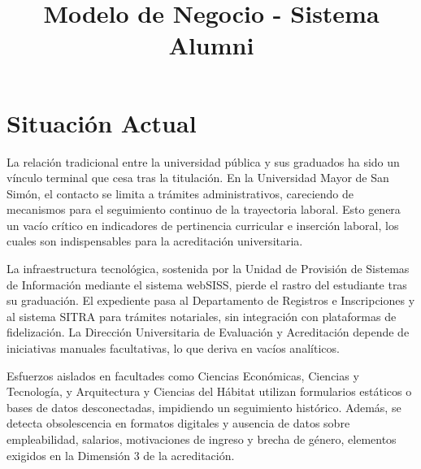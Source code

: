 \documentclass{./plantilla/umss}
\title{Modelo de Negocio - Sistema Alumni}
\begin{document}

\fairemarges
\fairepagedegarde

\section{Situación Actual}

La relación tradicional entre la universidad pública y sus graduados ha sido un vínculo terminal que cesa tras la titulación. En la Universidad Mayor de San Simón, el contacto se limita a trámites administrativos, careciendo de mecanismos para el seguimiento continuo de la trayectoria laboral. Esto genera un vacío crítico en indicadores de pertinencia curricular e inserción laboral, los cuales son indispensables para la acreditación universitaria.

La infraestructura tecnológica, sostenida por la Unidad de Provisión de Sistemas de Información mediante el sistema webSISS, pierde el rastro del estudiante tras su graduación. El expediente pasa al Departamento de Registros e Inscripciones y al sistema SITRA para trámites notariales, sin integración con plataformas de fidelización. La Dirección Universitaria de Evaluación y Acreditación depende de iniciativas manuales facultativas, lo que deriva en vacíos analíticos.

Esfuerzos aislados en facultades como Ciencias Económicas, Ciencias y Tecnología, y Arquitectura y Ciencias del Hábitat utilizan formularios estáticos o bases de datos desconectadas, impidiendo un seguimiento histórico. Además, se detecta obsolescencia en formatos digitales y ausencia de datos sobre empleabilidad, salarios, motivaciones de ingreso y brecha de género, elementos exigidos en la Dimensión 3 de la acreditación.
\end{document}
